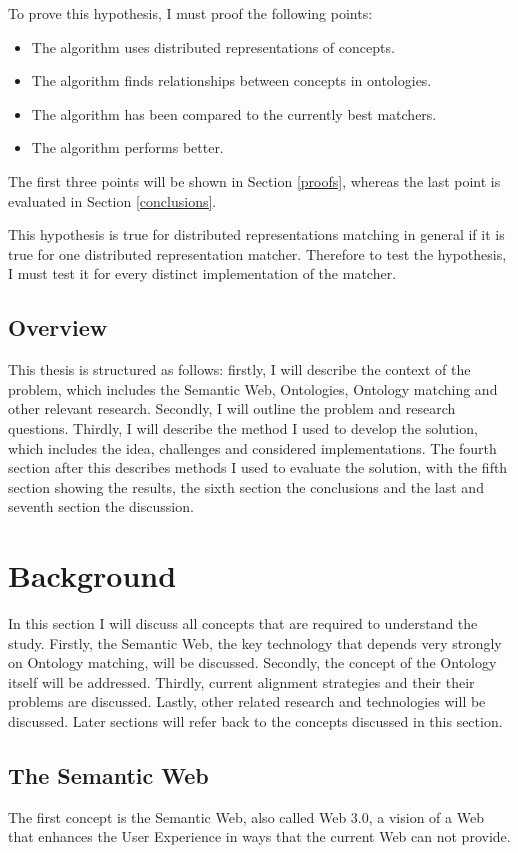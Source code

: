 \documentclass{article}
\begin{document}
 To prove this hypothesis, I must proof the following points:
 \begin{itemize}
 \item The algorithm uses distributed representations of concepts.
 \item The algorithm finds relationships between concepts in ontologies.
 \item The algorithm has been compared to the currently best matchers.
 \item The algorithm performs better.
 \end{itemize} 
 
 The first three points will be shown in Section \ref{proofs}, whereas the last point is evaluated in Section \ref{conclusions}.
 
 This hypothesis is true for distributed representations matching in general if it is true for one distributed representation matcher. Therefore to test the hypothesis, I must test it for every distinct implementation of the matcher.
 
 \subsection{Overview} %
 This thesis is structured as follows: firstly, I will describe the context of the problem, which includes the Semantic Web, Ontologies, Ontology matching and other relevant research. Secondly, I will outline the problem and research questions. Thirdly, I will describe the method I used to develop the solution, which includes the idea, challenges and considered implementations. The fourth section after this describes methods I used to evaluate the solution, with the fifth section showing the results, the sixth section the conclusions and the last and seventh section the discussion.
 
\newpage
\section{Background}
 In this section I will discuss all concepts that are required to understand the study. Firstly, the Semantic Web, the key technology that depends very strongly on Ontology matching, will be discussed. Secondly, the concept of the Ontology itself will be addressed. Thirdly, current alignment strategies and their their problems are discussed. Lastly, other related research and technologies will be discussed. Later sections will refer back to the concepts discussed in this section.
 \subsection{The Semantic Web}
  The first concept is the Semantic Web, also called Web 3.0, a vision of a Web that enhances the User Experience in ways that the current Web can not provide. 
\end{document}
